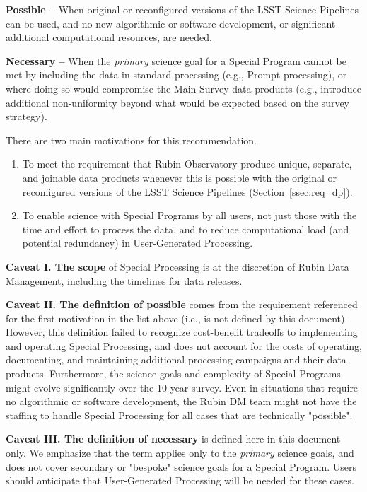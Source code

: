 \textbf{Possible -- } When original or reconfigured versions of the LSST
Science Pipelines can be used, and no new algorithmic or software development,
or significant additional computational resources, are needed.

\textbf{Necessary -- } When the \emph{primary} science goal for a Special Program 
cannot be met by including the data in standard processing (e.g., Prompt processing),
or where doing so would compromise the Main Survey data products (e.g., introduce additional
non-uniformity beyond what would be expected based on the survey strategy).

There are two main motivations for this recommendation.

\begin{enumerate}

\item To meet the requirement that Rubin Observatory produce
unique, separate, and joinable data products whenever this is possible 
with the original or reconfigured versions of the LSST Science Pipelines
(Section~\ref{ssec:req_dp}).

\item To enable science with Special Programs by all users, not just those
with the time and effort to process the data, and to reduce computational
load (and potential redundancy) in User-Generated Processing.

\end{enumerate}

\textbf{Caveat I. The scope} of Special Processing is at the discretion of
Rubin Data Management, including the timelines for data releases.

\textbf{Caveat II. The definition of possible} comes from the requirement referenced
for the first motivation in the list above (i.e., is not defined by this document).
However, this definition failed to recognize cost-benefit tradeoffs to implementing
and operating Special Processing, and does not account for the costs of operating,
documenting, and maintaining additional processing campaigns and their data products.
Furthermore, the science goals and complexity of Special Programs might evolve
significantly over the 10 year survey.
Even in situations that require no algorithmic or software development,
the Rubin DM team might not have the staffing to handle Special Processing
for all cases that are technically "possible".

\textbf{Caveat III. The definition of necessary} is defined here in this document only.
We emphasize that the term applies only to the \emph{primary} science goals, and does
not cover secondary or "bespoke" science goals for a Special Program.
Users should anticipate that User-Generated Processing will be needed for these cases.

